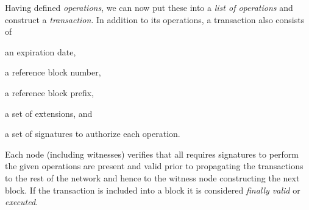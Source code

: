 Having defined \emph{operations}, we can now put these into a \emph{list of
operations} and construct a \emph{transaction}.
%
%
In addition to its operations, a transaction also consists of 
\begin{inparaenum}[(a)]
 \item an expiration date,
 \item a reference block number,
 \item a reference block prefix,
 \item a set of extensions, and
 \item a set of signatures to authorize each operation.
\end{inparaenum}

Each node (including witnesses) verifies that all requires signatures to
perform the given operations are present and valid prior to propagating the
transactions to the rest of the network and hence to the witness node
constructing the next block. If the transaction is included into a block it is
considered \emph{finally valid} or \emph{executed}.
